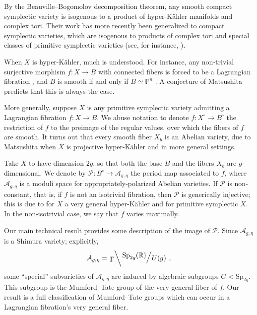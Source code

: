 \documentclass[12pt]{amsart}
\newcommand{\R}{\mathbb{R}}
\newcommand{\bbP}{\mathbb{P}}
\newcommand{\cP}{\mathcal{P}}
\newcommand{\cA}{\mathcal{A}}
\newcommand{\Sp}{\mathrm{Sp}}
\newcommand{\rightQ}[2]{\left.\raisebox{.2em}{$#1$}\middle/\raisebox{-.2em}{$#2$}\right.}
\newcommand{\leftQ}[2]{\left.\raisebox{-.2em}{$#2$}\middle\backslash\raisebox{.2em}{$#1$}\right.}
\theoremstyle{definition}
\numberwithin{equation}{section}
\begin{document}
By the Beauville--Bogomolov decomposition theorem, any smooth compact symplectic variety
is isogenous to a product of hyper-K\"ahler manifolds and complex tori. Their work has 
more recently been generalized to compact symplectic varieties, which are isogenous to 
products of complex tori and special classes of primitive symplectic varieties (see, 
for instance, \cite[Theorem 1.5]{horing-peternell19}).

When \(X\) is hyper-K\"ahler, much is understood. For instance, any non-trivial surjective
morphism \(f: X \to B\) with connected fibers is forced to be a Lagrangian fibration \cite{greb-lehn14}, 
and \(B\) is smooth if and only if \(B \simeq \bbP^n\) \cite{hwang08}. 
A conjecture of Matsushita predicts that this is always the case.

More generally, suppose \(X\) is any primitive symplectic variety admitting a 
Lagrangian fibration \(f: X \to B\). We abuse notation to denote \(f: X^\circ \to B^\circ\) 
the restriction of \(f\) to the preimage of the regular values, over which the fibers 
of \(f\) are smooth. It turns out that every smooth fiber \(X_b\) is an Abelian 
variety, due to Matsushita \cite{matsushita99} when \(X\) is projective hyper-K\"ahler 
and \cite{campana06} in more general settings.


Take \(X\) to have dimension \(2g\), so that both the base \(B\) and the fibers \(X_b\)
are \(g\)-dimensional. We denote by \(\cP: B^\circ \to \cA_{g, \eta}\) the period map 
associated to \(f\), where \(\cA_{g, \eta}\) is a moduli space for appropriately-polarized
Abelian varieties. If \(\cP\) is non-constant, that is, if \(f\) is not an isotrivial fibration,
then \(\cP\) is generically injective; this is due to \cite{geemen-voisin16} for 
\(X\) a very general hyper-K\"ahler and \cite{bakker25} for primitive symplectic \(X\).
In the non-isotrivial case, we say that \(f\) varies maximally.

Our main technical result provides some description of the image of \(\cP\). Since 
\(\cA_{g, \eta}\) is a Shimura variety; explicitly,
\begin{equation*}
    \cA_{g, \eta} = \leftQ{\rightQ{\Sp_{2g}(\R)}{U(g)}}{\Gamma},
\end{equation*}
some ``special'' subvarieties of \(\cA_{g, \eta}\) are induced by algebraic 
subgroups \(G < \Sp_{2g}\). This subgroup is the Mumford--Tate group of the
very general fiber of \(f\). Our result is a full classification of Mumford--Tate 
groups which can occur in a Lagrangian fibration's very general fiber. 
\end{document}
